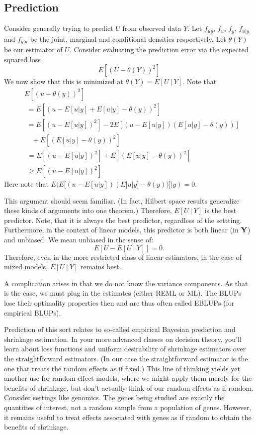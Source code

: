 \subsection{Prediction}

Consider generally trying to predict $U$ from observed data $Y$. 
Let $f_{uy}$, $f_u$, $f_y$, $f_{u|y}$ and $f_{y|u}$ be the
joint, marginal and conditional densities respectively. Let
$\theta(Y)$ be our estimator of $U$. Consider
evaluating the prediction error via the expected squared loss
$$
E[(U -\theta(Y))^2]
$$
We now show that this is  minimized at $\theta(Y) = E[U ~|~ Y]$. 
Note that
\begin{align*}
&E[(u -\theta(y))^2] \\ 
&\,\, = E[(u - E[u | y] + E[u | y] - \theta(y))^2] \\
&\,\, = E[(u - E[u | y])^2] - 2 E[(u - E[u | y]) (E[u | y] - \theta(y))] \\
&\,\ \, \, \, \, + E[(E[u | y] - \theta(y))^2] \\
&\,\ = E[(u - E[u | y])^2] + E[(E[u | y] - \theta(y))^2] \\
&\,\  \geq E[(u - E[u | y])^2].
\end{align*}
Here note that $E(E[(u - E[u | y]) (E[u | y] - \theta(y))] |y) = 0$.

This argument should seem familiar. (In fact, Hilbert space results generalize these
kinds of arguments into one theorem.) Therefore, $E[U~|~Y]$ is the best
predictor. Note, that it is always the best predictor, regardless of the settting.
Furthermore, in the context of linear models, this predictor is both linear (in $\mathbf{Y}$)
and unbiased. We mean unbiased in the sense of:
$$
E[ U - E[U ~|~ Y]] = 0.
$$
Therefore, even in the more restricted class of linear estimators, in the
case of mixed models, $E[U ~|~ Y]$ remains best. 

A complication arises in that we do not know the variance components. As
that is the case, we must plug in the estimates (either REML or ML). 
The BLUPs lose their optimality properties then and are thus often called
EBLUPs (for empirical BLUPs). 

Prediction of this sort relates to so-called empirical Bayesian prediction 
and shrinkage estimation. In your more advanced classes on decision theory,
you'll learn about loss functions and uniform desirability of shrinkage
estimators over the straightforward estimators. (In our case the straightforward
estimator is the one that treats the random
effects as if fixed.) This line of thinking yields yet another use for random effect models, where
we might apply them merely for the benefits of shrinkage,
but don't actually think of our random effects as if random. Consider
settings like genomics. The genes being studied are exactly the quantities
of interest, not a random sample from a population of genes. However, it
remains useful to treat effects associated with genes as if random to 
obtain the benefits of shrinkage.


